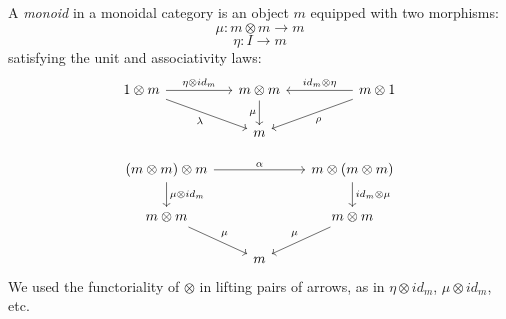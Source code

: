 \documentclass[DaoFP]{subfiles}
\begin{document}
A \emph{monoid} in a monoidal category is an object $m$ equipped with two morphisms:
\[ \mu \colon m \otimes m \to m \]
\[ \eta \colon I \to m \]
satisfying the unit and associativity laws:
\[
 \begin{tikzcd}
 1 \otimes m
 \arrow[rr, "\eta \otimes id_m"]
 \arrow[rrd, "\lambda"']
& & m \otimes m
 \arrow[d, "\mu"']
&& m \otimes 1
 \arrow[ll, "id_m \otimes \eta"']
 \arrow[lld, "\rho"]
 \\
 && m
  \end{tikzcd}
\]

\[
 \begin{tikzcd}
 (m \otimes m) \otimes m 
 \arrow[rr, "\alpha"]
 \arrow[d, "\mu \otimes id_m"]
 &&
 m \otimes (m \otimes m)
 \arrow[d, "id_m \otimes \mu"]
 \\
 m \otimes m 
 \arrow[dr, "\mu"]
& & m \otimes m
 \arrow[dl, "\mu"']
 \\
&  m
 \end{tikzcd}
\]
We used the functoriality of $\otimes$ in lifting pairs of arrows, as in $\eta \otimes id_m$, $\mu \otimes id_m$, etc.
\end{document}
